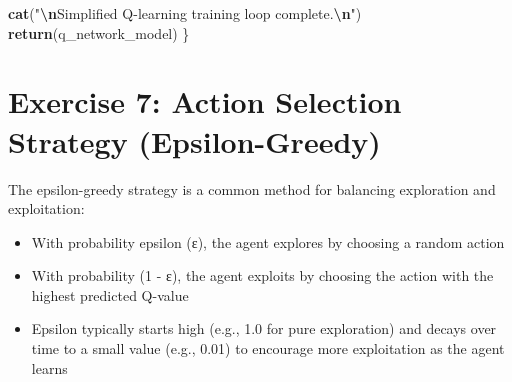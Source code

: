 \documentclass[
]{article}
\newenvironment{Shaded}{\begin{snugshade}}{\end{snugshade}}
\newcommand{\FunctionTok}[1]{\textcolor[rgb]{0.13,0.29,0.53}{\textbf{#1}}}
\newcommand{\NormalTok}[1]{#1}
\newcommand{\SpecialCharTok}[1]{\textcolor[rgb]{0.81,0.36,0.00}{\textbf{#1}}}
\newcommand{\StringTok}[1]{\textcolor[rgb]{0.31,0.60,0.02}{#1}}
\providecommand{\tightlist}{%
  \setlength{\itemsep}{0pt}\setlength{\parskip}{0pt}}
\begin{document}
\begin{Shaded}
\begin{Highlighting}[]
  \FunctionTok{cat}\NormalTok{(}\StringTok{"}\SpecialCharTok{\textbackslash{}n}\StringTok{Simplified Q{-}learning training loop complete.}\SpecialCharTok{\textbackslash{}n}\StringTok{"}\NormalTok{)}
  \FunctionTok{return}\NormalTok{(q\_network\_model)}
\NormalTok{\}}
\end{Highlighting}
\end{Shaded}

\hypertarget{exercise-7-action-selection-strategy-epsilon-greedy}{%
\section{Exercise 7: Action Selection Strategy
(Epsilon-Greedy)}\label{exercise-7-action-selection-strategy-epsilon-greedy}}

The epsilon-greedy strategy is a common method for balancing exploration
and exploitation:

\begin{itemize}
\tightlist
\item
  With probability epsilon (ε), the agent explores by choosing a random
  action
\item
  With probability (1 - ε), the agent exploits by choosing the action
  with the highest predicted Q-value
\item
  Epsilon typically starts high (e.g., 1.0 for pure exploration) and
  decays over time to a small value (e.g., 0.01) to encourage more
  exploitation as the agent learns
\end{itemize}
\end{document}
